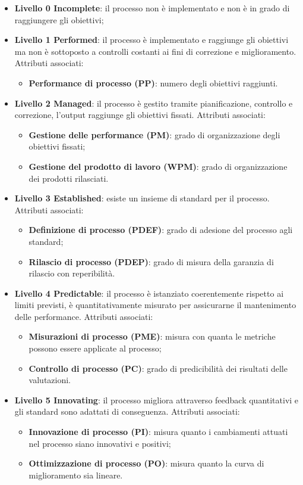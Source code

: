 \begin{itemize}
	\item \textbf{Livello 0 Incomplete}: il processo non è implementato e non è in grado di raggiungere gli obiettivi;
	\item \textbf{Livello 1 Performed}: il processo è implementato e raggiunge gli obiettivi ma non è sottoposto a controlli costanti ai fini di correzione e miglioramento.
	Attributi associati:
	\begin{itemize}
		\item \textbf{Performance di processo (PP)}: numero degli obiettivi raggiunti.
	\end{itemize}
	\item \textbf{Livello 2 Managed}: il processo è gestito tramite pianificazione, controllo e correzione, l'output raggiunge gli obiettivi fissati.
	Attributi associati:
	\begin{itemize}
		\item \textbf{Gestione delle performance (PM)}: grado di organizzazione degli obiettivi fissati;
		\item \textbf{Gestione del prodotto di lavoro (WPM)}: grado di organizzazione dei prodotti rilasciati.
	\end{itemize}
	\item \textbf{Livello 3 Established}: esiste un insieme di standard per il processo.
	Attributi associati:
	\begin{itemize}
		\item \textbf{Definizione di processo (PDEF)}: grado di adesione del processo agli standard;
		\item \textbf{Rilascio di processo (PDEP)}: grado di misura della garanzia di rilascio con reperibilità.
	\end{itemize}
	\item \textbf{Livello 4 Predictable}: il processo è istanziato coerentemente rispetto ai limiti previsti, è quantitativamente misurato per assicurarne il mantenimento delle performance.
	Attributi associati:
	\begin{itemize}
		\item \textbf{Misurazioni di processo (PME)}: misura con quanta  le metriche possono essere applicate al processo;
		\item \textbf{Controllo di processo (PC)}: grado di predicibilità dei risultati delle valutazioni.
	\end{itemize}
	\item \textbf{Livello 5 Innovating}: il processo migliora attraverso feedback quantitativi e gli standard sono adattati di conseguenza.
	Attributi associati:
	\begin{itemize}
		\item \textbf{Innovazione di processo (PI)}: misura quanto i cambiamenti attuati nel processo siano innovativi e positivi;
		\item \textbf{Ottimizzazione di processo (PO)}: misura quanto la curva di miglioramento sia lineare.
	\end{itemize}
\end{itemize}
